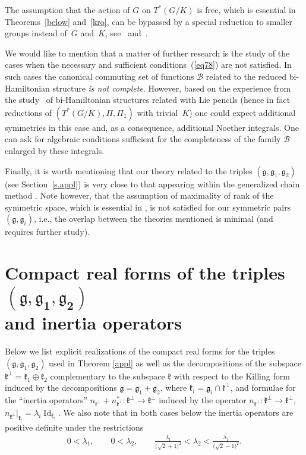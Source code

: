\documentclass[10pt,a4paper]{amsart}
\numberwithin{equation}{section}
\begin{document}
The assumption that the action of $G$ on $T^*(G/K)$ is free, which is essential in Theorems~\ref{below} and~\ref{kro}, can be bypassed by a special reduction to smaller groups instead of~$G$ and~$K$, see~\cite{pMyk} and~\cite{p4}.

We would like to mention that a matter of further research is the study of the cases when the necessary and sufficient conditions~(\ref{eq78}) are not satisfied. In such cases the canonical commuting set of functions $\mathcal{B}$ related to the reduced bi-Hamiltonian structure \emph{is not complete}. However, based on the experience from the study~\cite{pSymmetries} of bi-Hamiltonian structures related with Lie pencils (hence in fact reductions of $(T^*(G/K),\Pi,\Pi_1)$ with trivial~$K$) one could expect additional symmetries in this case and, as a consequence, additional Noether integrals. One can ask for algebraic conditions sufficient for the completeness of the family $\mathcal{B}$ enlarged by these integrals.

Finally, it is worth mentioning that our theory related to the triples $(\mathfrak{g},\mathfrak{g}_1,\mathfrak{g}_2)$ (see Section~\ref{s.appl}) is very close to that appearing within the generalized chain method \cite{bj3, bjObzor}. Note however, that the assumption of maximality of rank of the symmetric space, which is essential in \cite[Theorem~8.6]{bjObzor}, is not satisfied for our symmetric pairs $(\mathfrak{g},\mathfrak{g}_i)$, i.e., the overlap between the theories mentioned is minimal (and requires further study).

\appendix

\section[Compact real forms of the triples $(\mathfrak{g},\mathfrak{g}_1,\mathfrak{g}_2)$ and inertia operators]{Compact real forms of the triples $\boldsymbol{(\mathfrak{g},\mathfrak{g}_1,\mathfrak{g}_2)}$\\ and inertia operators}\label{appe}

Below we list explicit realizations of the compact real forms for the triples $(\mathfrak{g},\mathfrak{g}_1,\mathfrak{g}_2)$ used in Theorem \ref{appl} as well as the decompositions of the subspace $\mathfrak{k}^\perp=\mathfrak{k}_1\oplus\mathfrak{k}_2$ complementary to the subspace $\mathfrak{k}$ with respect to the Killing form induced by the decompositions $\mathfrak{g}=\mathfrak{g}_1+\mathfrak{g}_2$, where $\mathfrak{k}_i=\mathfrak{g}_i\cap\mathfrak{k}^\perp$, and formulae for the ``inertia operators'' $n_{\mathfrak{k}^\perp}+n^*_{\mathfrak{k}^\perp}\colon \mathfrak{k}^\perp\to\mathfrak{k}^\perp$ induced by the operator $n_{\mathfrak{k}^\perp}\colon \mathfrak{k}^\perp\to\mathfrak{k}^\perp$, $n_{\mathfrak{k}^\perp}|_{\mathfrak{k}_i}=\lambda_i\operatorname{Id}_{\mathfrak{k}_i}$. We also note that in both cases below the inertia operators are positive definite under the restrictions
\begin{gather*}
0<\lambda_1,\qquad 0<\lambda_2,\qquad
{\frac {\lambda_{1} }{\big(\sqrt {2}+1\big)^2}}< \lambda_{2}<{\frac {\lambda_{1} }{\big(\sqrt {2}-1\big)^2}}.
\end{gather*}
\end{document}
